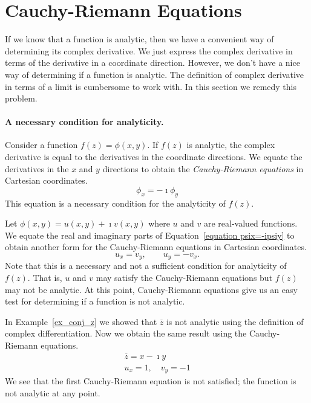\section{Cauchy-Riemann Equations}





If we know that a function is analytic, then we have a convenient way of
determining its complex derivative.  We just express the complex derivative
in terms of the derivative in a coordinate direction.  However, we don't 
have a nice way of determining if a function is analytic.  The definition
of complex derivative in terms of a limit is cumbersome to work with.  In 
this section we remedy this problem.



\paragraph{A necessary condition for analyticity.}
Consider a function $f(z) = \phi(x,y)$.  If $f(z)$ is analytic, the complex
derivative is equal to the derivatives in the coordinate directions.
We equate the derivatives in the $x$ and $y$ directions to obtain the 
\textit{Cauchy-Riemann equations} in Cartesian coordinates.
\begin{equation}
  \label{equation psix=-ipsiy}
  \phi_x = -\imath \phi_y
\end{equation}
This equation is a necessary condition for the analyticity of $f(z)$.

Let $\phi(x,y) = u(x,y) + \imath v(x,y)$ where $u$ and $v$ are real-valued
functions.  We equate the real and imaginary parts of
Equation~\ref{equation psix=-ipsiy} to obtain another form for the
Cauchy-Riemann equations in Cartesian coordinates.
\[
u_x = v_y, \qquad u_y = - v_x.
\]
Note that this is a necessary and not a sufficient condition for
analyticity of $f(z)$.  That is, $u$ and $v$ may satisfy the
Cauchy-Riemann equations but $f(z)$ may not be analytic.  At this
point, Cauchy-Riemann equations give us an easy test for determining
if a function is not analytic.






\begin{Example}
  In Example~\ref{ex_conj_z} we showed that $\overline{z}$ is not analytic
  using the definition of complex differentiation.
  Now we obtain the same result using the Cauchy-Riemann equations.
  \begin{gather*}
    \overline{z} = x - \imath y 
    \\
    u_x = 1, \quad v_y = -1
  \end{gather*}
  We see that the first Cauchy-Riemann equation is not satisfied; 
  the function is not analytic at any point.
\end{Example}





